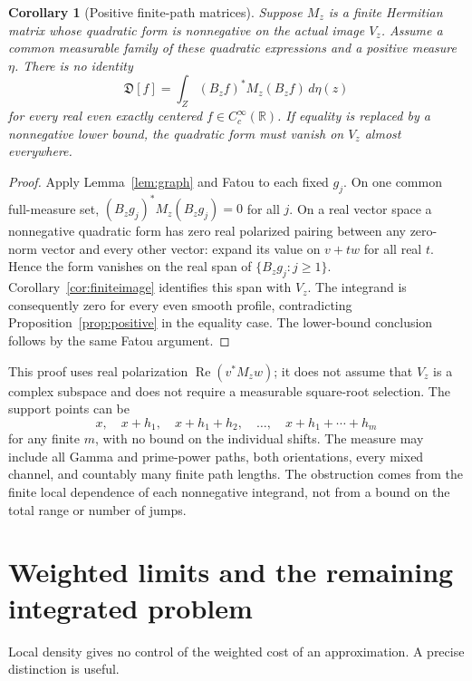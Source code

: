 \documentclass[11pt,a4paper]{article}
\numberwithin{equation}{section}
\newtheorem{corollary}[theorem]{Corollary}
\theoremstyle{definition}
\theoremstyle{remark}
\newcommand{\R}{\mathbb R}
\newcommand{\Def}{\mathfrak D}
\begin{document}
\begin{corollary}[Positive finite-path matrices]\label{cor:paths}
Suppose $M_z$ is a finite Hermitian matrix whose quadratic form is nonnegative on the actual image $V_z$. Assume a common measurable family of these quadratic expressions and a positive measure $\eta$. There is no identity
\begin{equation}\label{eq:matrixidentity}
 \Def[f]=\int_Z(B_zf)^*M_z(B_zf)\,d\eta(z)
\end{equation}
for every real even exactly centered $f\in C_c^\infty(\R)$. If equality is replaced by a nonnegative lower bound, the quadratic form must vanish on $V_z$ almost everywhere.
\end{corollary}
\begin{proof}
Apply Lemma~\ref{lem:graph} and Fatou to each fixed $g_j$. On one common full-measure set,
$(B_zg_j)^*M_z(B_zg_j)=0$ for all $j$. On a real vector space a nonnegative quadratic form has zero real polarized pairing between any zero-norm vector and every other vector: expand its value on $v+tw$ for all real $t$. Hence the form vanishes on the real span of $\{B_zg_j:j\ge1\}$. Corollary~\ref{cor:finiteimage} identifies this span with $V_z$. The integrand is consequently zero for every even smooth profile, contradicting Proposition~\ref{prop:positive} in the equality case. The lower-bound conclusion follows by the same Fatou argument.
\end{proof}

This proof uses real polarization $\operatorname{Re}(v^*M_zw)$; it does not assume that $V_z$ is a complex subspace and does not require a measurable square-root selection. The support points can be
\[
 x,\quad x+h_1,\quad x+h_1+h_2,\quad\ldots,\quad x+h_1+\cdots+h_m
\]
for any finite $m$, with no bound on the individual shifts. The measure may include all Gamma and prime-power paths, both orientations, every mixed channel, and countably many finite path lengths. The obstruction comes from the finite local dependence of each nonnegative integrand, not from a bound on the total range or number of jumps.

\section{Weighted limits and the remaining integrated problem}\label{sec:scope}

Local density gives no control of the weighted cost of an approximation. A precise distinction is useful.
\end{document}
